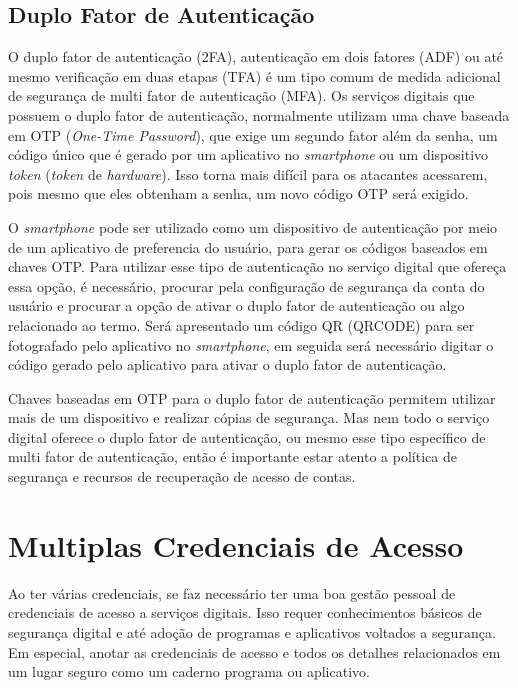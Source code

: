\documentclass[12pt]{article}
\begin{document}
\subsection{Duplo Fator de Autenticação}

O duplo fator de autenticação (2FA), autenticação em dois fatores (ADF) ou
até mesmo verificação em duas etapas (TFA) é um tipo comum de medida adicional
de segurança de multi fator de autenticação (MFA).
Os serviços digitais que possuem o duplo fator de autenticação, normalmente
utilizam uma chave baseada em OTP (\textit{One-Time Password}), que exige um segundo fator
além da senha, um código único que é gerado por um aplicativo no \textit{smartphone} ou um
dispositivo \textit{token} (\textit{token} de \textit{hardware}).
Isso torna mais difícil para os atacantes acessarem, pois mesmo que eles
obtenham a senha, um novo código OTP será exigido.

O \textit{smartphone} pode ser utilizado como um dispositivo de autenticação por meio de um
aplicativo de preferencia do usuário, para gerar os códigos baseados em chaves OTP.
Para utilizar esse tipo de autenticação no serviço digital que ofereça essa opção,
é necessário, procurar pela configuração de segurança da conta do usuário e procurar
a opção de ativar o duplo fator de autenticação ou algo relacionado ao termo.
Será apresentado um código QR (QRCODE) para ser fotografado pelo aplicativo no \textit{smartphone},
em seguida será necessário digitar o código gerado pelo aplicativo para ativar o
duplo fator de autenticação.

Chaves baseadas em OTP para o duplo fator de autenticação permitem utilizar mais
de um dispositivo e realizar cópias de segurança.
Mas nem todo o serviço digital oferece o duplo fator de autenticação, ou
mesmo esse tipo específico de multi fator de autenticação, então é importante
estar atento a política de segurança e recursos de recuperação de acesso de contas.

\section{Multiplas Credenciais de Acesso}

Ao ter várias credenciais, se faz necessário ter uma boa gestão pessoal de credenciais
de acesso a serviços digitais.
Isso requer conhecimentos básicos de segurança digital e até adoção de programas e
aplicativos voltados a segurança.
Em especial, anotar as credenciais de acesso e todos os detalhes relacionados em um
lugar seguro como um caderno programa ou aplicativo.
\end{document}
